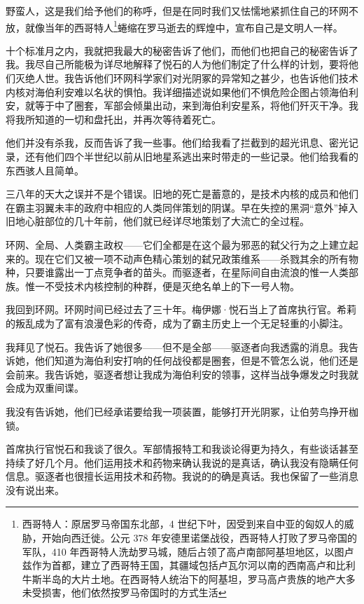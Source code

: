 \documentclass[AutoFakeBold=true]{book}
\begin{document}
{野蛮人，这是我们给予他们的称呼，但是在同时我们又怯懦地紧抓住自己的环网不放，就像当年的西哥特人\footnote{西哥特人：原居罗马帝国东北部，4 世纪下叶，因受到来自中亚的匈奴人的威胁，开始向西迁徙。公元 378 年安德里诺堡战役，西哥特人打败了罗马帝国的军队，410 年西哥特人洗劫罗马城，随后占领了高卢南部阿基坦地区，以图卢兹作为首都，建立了西哥特王国，其疆域包括卢瓦尔河以南的西南高卢和比利牛斯半岛的大片土地。在西哥特人统治下的阿基坦，罗马高卢贵族的地产大多未受损害，他们依然按罗马帝国时的方式生活}蜷缩在罗马逝去的辉煌中，宣布自己是文明人一样。

十个标准月之内，我就把我最大的秘密告诉了他们，而他们也把自己的秘密告诉了我。我尽自己所能极为详尽地解释了悦石的人为他们制定了什么样的计划，要将他们灭绝人世。我告诉他们环网科学家们对光阴冢的异常知之甚少，也告诉他们技术内核对海伯利安难以名状的惧怕。我详细描述说如果他们不惧危险企图占领海伯利安，就等于中了圈套，军部会倾巢出动，来到海伯利安星系，将他们歼灭干净。我将我所知道的一切和盘托出，并再次等待着死亡。

他们并没有杀我，反而告诉了我一些事。他们给我看了拦截到的超光讯息、密光记录，还有他们四个半世纪以前从旧地星系逃出来时带走的一些记录。他们给我看的东西骇人且简单。

三八年的天大之误并不是个错误。旧地的死亡是蓄意的，是技术内核的成员和他们在霸主羽翼未丰的政府中相应的人类同伴策划的阴谋。早在失控的黑洞``意外''掉入旧地心脏部位的几十年前，他们就已经详尽地策划了大流亡的全过程。

环网、全局、人类霸主政权——它们全都是在这个最为邪恶的弑父行为之上建立起来的。现在它们又被一项不动声色精心策划的弑兄政策维系——杀戮其余的所有物种，只要谁露出一丁点竞争者的苗头。而驱逐者，在星际间自由流浪的惟一人类部族。惟一不受技术内核控制的种群，便是灭绝名单上的下一号人物。

我回到环网。环网时间已经过去了三十年。梅伊娜·悦石当上了首席执行官。希莉的叛乱成为了富有浪漫色彩的传奇，成为了霸主历史上一个无足轻重的小脚注。

我拜见了悦石。我告诉了她很多——但不是全部——驱逐者向我透露的消息。我告诉她，他们知道为海伯利安打响的任何战役都是圈套，但是不管怎么说，他们还是会前来。我告诉她，驱逐者想让我成为海伯利安的领事，这样当战争爆发之时我就会成为双重间谍。

我没有告诉她，他们已经承诺要给我一项装置，能够打开光阴冢，让伯劳鸟挣开枷锁。

首席执行官悦石和我谈了很久。军部情报特工和我谈论得更为持久，有些谈话甚至持续了好几个月。他们运用技术和药物来确认我说的是真话，确认我没有隐瞒任何信息。驱逐者也很擅长运用技术和药物。我说的的确是真话。我也保留了一些消息没有说出来。

}
\end{document}

